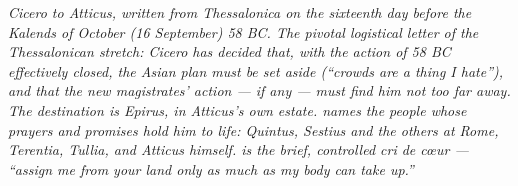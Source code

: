 
\textit{Cicero to Atticus, written from Thessalonica on the
sixteenth day before the Kalends of October (16 September) 58
BC. The pivotal logistical letter of the Thessalonican stretch:
Cicero has decided that, with the action of 58 BC effectively
closed, the Asian plan must be set aside (``crowds are a thing
I hate''), and that the new magistrates' action --- if any ---
must find him not too far away. The destination is Epirus, in
Atticus's own estate.  names the people whose
prayers and promises hold him to life: Quintus, Sestius and
the others at Rome, Terentia, Tullia, and Atticus himself.
 is the brief, controlled cri de c\oe ur ---
``assign me from your land only as much as my body can take
up.''}
